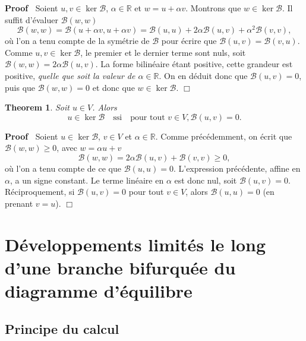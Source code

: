 \documentclass{article}
\newcommand{\tmem}[1]{{\em #1\/}}
\newenvironment{proof}{\noindent\textbf{Proof\ }}{\hspace*{\fill}$\Box$\medskip}
\newtheorem{theorem}{Theorem}
\begin{document}
\begin{proof}
  Soient $u, v∈\ker \mathcal{B}$, $α∈\mathbb{R}$ et $w = u +
  α v$. Montrons que $w∈\ker \mathcal{B}$. Il suffit d'évaluer
  $\mathcal{B} (w, w)$
  \begin{equation}
    \mathcal{B} (w, w) =\mathcal{B} (u + α v, u + α v) =\mathcal{B}
    (u, u) + 2 α \mathcal{B} (u, v) + α^2 \mathcal{B} (v, v),
  \end{equation}
  où l'on a tenu compte de la symétrie de $\mathcal{B}$ pour
  écrire que $\mathcal{B} (u, v) =\mathcal{B} (v, u)$. Comme $u, v \in
  \ker \mathcal{B}$, le premier et le dernier terme sont nuls, soit
  $\mathcal{B} (w, w) = 2 α \mathcal{B} (u, v)$. La forme bilinéaire
  étant positive, cette grandeur est positive, {\tmem{quelle que soit la
  valeur de $α∈\mathbb{R}$}}. On en déduit donc que $\mathcal{B}
  (u, v) = 0$, puis que $\mathcal{B} (w, w) = 0$ et donc que $w∈\ker
  \mathcal{B}.$
\end{proof}

\begin{theorem}
  Soit $u∈V$. Alors
  \begin{equation}
    u∈\ker \mathcal{B} \quad \text{ssi} \quad \text{pour tout } v∈V,
    \mathcal{B} (u, v) = 0.
  \end{equation}
\end{theorem}

\begin{proof}
  Soient $u∈\ker \mathcal{B}$, $v∈V$ et $α∈\mathbb{R}$. Comme
  précédemment, on écrit que $\mathcal{B} (w, w) \geq 0$, avec $w
  = α u + v$
  \begin{equation}
    \mathcal{B} (w, w) = 2 α \mathcal{B} (u, v) +\mathcal{B} (v, v) \geq
    0,
  \end{equation}
  où l'on a tenu compte de ce que $\mathcal{B} (u, u) = 0$. L'expression
  précédente, affine en $α$, a un signe constant. Le terme
  linéaire en $α$ est donc nul, soit $\mathcal{B} (u, v) = 0$.
  Réciproquement, si $\mathcal{B} (u, v) = 0$ pour tout $v∈V$, alors
  $\mathcal{B} (u, u) = 0$ (en prenant $v = u$).
\end{proof}

\section{Développements limités le long d'une branche bifurquée du
diagramme d'équilibre}

\subsection{Principe du calcul}\label{sec20220107121442}
\end{document}
